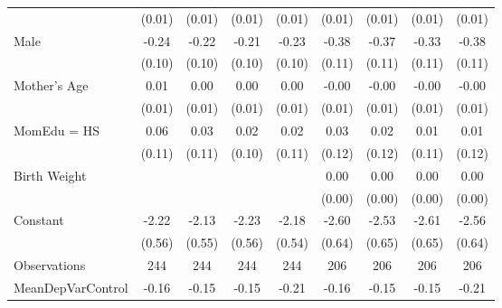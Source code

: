 {\begin{tabular}{l*{8}{c}}
                    &      (0.01)         &      (0.01)         &      (0.01)         &      (0.01)         &      (0.01)         &      (0.01)         &      (0.01)         &      (0.01)         \\
[1em]
Male                &       -0.24\sym{**} &       -0.22\sym{**} &       -0.21\sym{**} &       -0.23\sym{**} &       -0.38\sym{***}&       -0.37\sym{***}&       -0.33\sym{***}&       -0.38\sym{***}\\
                    &      (0.10)         &      (0.10)         &      (0.10)         &      (0.10)         &      (0.11)         &      (0.11)         &      (0.11)         &      (0.11)         \\
[1em]
Mother's Age        &        0.01         &        0.00         &        0.00         &        0.00         &       -0.00         &       -0.00         &       -0.00         &       -0.00         \\
                    &      (0.01)         &      (0.01)         &      (0.01)         &      (0.01)         &      (0.01)         &      (0.01)         &      (0.01)         &      (0.01)         \\
[1em]
MomEdu = HS         &        0.06         &        0.03         &        0.02         &        0.02         &        0.03         &        0.02         &        0.01         &        0.01         \\
                    &      (0.11)         &      (0.11)         &      (0.10)         &      (0.11)         &      (0.12)         &      (0.12)         &      (0.11)         &      (0.12)         \\
[1em]
Birth Weight        &                     &                     &                     &                     &        0.00\sym{**} &        0.00\sym{**} &        0.00\sym{**} &        0.00\sym{**} \\
                    &                     &                     &                     &                     &      (0.00)         &      (0.00)         &      (0.00)         &      (0.00)         \\
[1em]
Constant            &       -2.22\sym{***}&       -2.13\sym{***}&       -2.23\sym{***}&       -2.18\sym{***}&       -2.60\sym{***}&       -2.53\sym{***}&       -2.61\sym{***}&       -2.56\sym{***}\\
                    &      (0.56)         &      (0.55)         &      (0.56)         &      (0.54)         &      (0.64)         &      (0.65)         &      (0.65)         &      (0.64)         \\
\hline
Observations        &         244         &         244         &         244         &         244         &         206         &         206         &         206         &         206         \\
MeanDepVarControl   &       -0.16         &       -0.15         &       -0.15         &       -0.21         &       -0.16         &       -0.15         &       -0.15         &       -0.21         \\
\hline\hline
\end{tabular}
}
